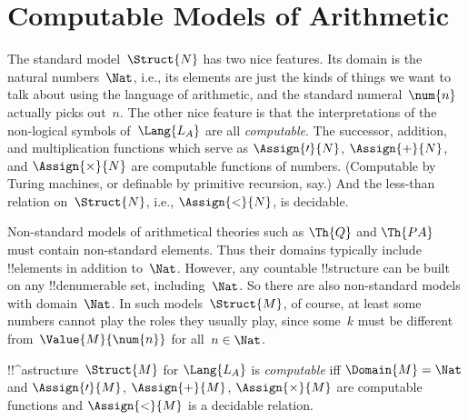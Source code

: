 \documentclass[../../../include/open-logic-section]{subfiles}
\begin{document}
\section{Computable Models of Arithmetic}

\begin{explain}
The standard model~$\Struct{N}$ has two nice features. Its domain is
the natural numbers~$\Nat$, i.e., its elements are just the kinds of
things we want to talk about using the language of arithmetic, and the
standard numeral~$\num{n}$ actually picks out~$n$. The other nice
feature is that the interpretations of the non-logical symbols
of~$\Lang{L_A}$ are all \emph{computable}. The successor, addition,
and multiplication functions which serve as $\Assign{\prime}{N}$,
$\Assign{+}{N}$, and $\Assign{\times}{N}$ are computable functions of
numbers. (Computable by Turing machines, or definable by primitive
recursion, say.) And the less-than relation on~$\Struct{N}$, i.e.,
$\Assign{<}{N}$, is decidable.

Non-standard models of arithmetical theories such as $\Th{Q}$ and
$\Th{PA}$ must contain non-standard elements. Thus their domains
typically include !!{element}s in addition to~$\Nat$. However, any
countable !!{structure} can be built on any !!{denumerable} set,
including~$\Nat$. So there are also non-standard models with
domain~$\Nat$. In such models~$\Struct{M}$, of course, at least some
numbers cannot play the roles they usually play, since some~$k$ must
be different from~$\Value{M}{\num{n}}$ for all~$n \in \Nat$.
\end{explain}

\begin{defn}
!!^a{structure}~$\Struct{M}$ for $\Lang{L_A}$ is \emph{computable} iff
  $\Domain{M} = \Nat$ and $\Assign{\prime}{M}$, $\Assign{+}{M}$,
  $\Assign{\times}{M}$ are computable functions and $\Assign{<}{M}$ is
  a decidable relation.
\end{defn}
\end{document}
